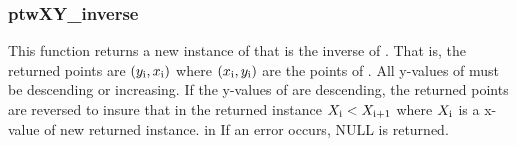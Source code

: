 \subsubsection{ptwXY\_inverse}
This function returns a new instance of  that is the inverse of .
That is, the returned points are $(y_{\rm i},x_{\rm i})$ where $(x_{\rm i},y_{\rm i})$ are the points of .
All y-values of  must be descending or increasing. If the y-values of  are descending,
the returned points are reversed to insure that in the returned instance $X_{\rm i} < X_{\rm i+1}$ where $X_{\rm i}$ is a 
x-value of new returned instance.
     in \noindent
If an error occurs, NULL is returned.
